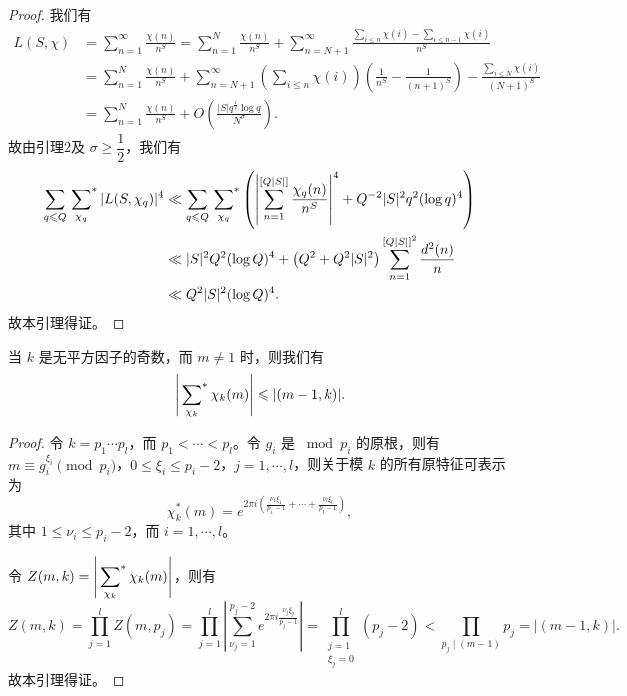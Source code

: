 \begin{proof}
我们有
\begin{align*}
L(S,\chi)
&=\sum_{n=1}^{\infty}\frac{\chi(n)}{n^S}
=\sum_{n=1}^{N}\frac{\chi(n)}{n^S}
+\sum_{n=N+1}^{\infty}
\frac{\sum_{i\leqslant n}\chi(i)-\sum_{i\leqslant n-1}\chi(i)}{n^S}\\
&=\sum_{n=1}^{N}\frac{\chi(n)}{n^S}
+\sum_{n=N+1}^{\infty}
\left(\sum_{i\leqslant n}\chi(i)\right)
\left(\frac{1}{n^S}-\frac{1}{(n+1)^S}\right)
-\frac{\sum_{i\leqslant N}\chi(i)}{(N+1)^S}\\
&=\sum_{n=1}^{N}\frac{\chi(n)}{n^S}
+O\left(\frac{|S|q^{\frac12}\log q}{N^\sigma}\right).
\end{align*}
故由引理2及 $\sigma\geqslant\dfrac12$，我们有
\begin{align*}
\sum_{q\leqslant Q}\sideset{}{^*}\sum_{\chi_q}|L(S,\chi_q)|^4
&\ll\sum_{q\leqslant Q}\sideset{}{^*}\sum_{\chi_q}
\left(\left|\sum_{n=1}^{[Q|S|]}\frac{\chi_q(n)}{n^S}\right|^4
+Q^{-2}|S|^2q^2(\log q)^4\right)\\
&\ll|S|^2Q^2(\log Q)^4
+\left(Q^2+Q^2|S|^2\right)\sum_{n=1}^{[Q|S|]^2}\frac{d^2(n)}{n}\\
&\ll Q^2|S|^2(\log Q)^4.
\end{align*}
故本引理得证。
\end{proof}

\begin{lemma}
当 $k$ 是无平方因子的奇数，而 $m\neq1$ 时，则我们有
\[
\left|\sideset{}{^*}\sum_{\chi_k}\chi_k(m)\right|
\leqslant|(m-1,k)|.
\]
\end{lemma}

\begin{proof}
令 $k=p_1\cdots p_l$，而 $p_1<\cdots<p_l$。令 $g_i$ 是 $\bmod p_i$ 的原根，则有 $m\equiv g_i^{\xi_i}\pmod{p_i}$，$0\leqslant\xi_i\leqslant p_i-2$，$j=1,\cdots,l$，则关于模 $k$ 的所有原特征可表示为
\[
\chi_k^*(m)=e^{2\pi i\left(\frac{\nu_1\xi_1}{p_1-1}+\cdots+\frac{\nu_l\xi_l}{p_l-1}\right)},
\]
其中 $1\leqslant\nu_i\leqslant p_i-2$，而 $i=1,\cdots,l$。

令 $\displaystyle Z(m,k)=\left|\sideset{}{^*}\sum_{\chi_k}\chi_k(m)\right|$，则有
\[
Z(m,k)=\prod_{j=1}^{l}Z(m,p_j)
=\prod_{j=1}^{l}\left|\sum_{\nu_j=1}^{p_j-2}
e^{2\pi i\frac{\nu_j\xi_j}{p_j-1}}\right|
=\prod_{\substack{j=1\\\xi_j=0}}^{l}(p_j-2)
<\prod_{p_j\mid(m-1)}p_j
=|(m-1,k)|.
\]
故本引理得证。
\end{proof}

